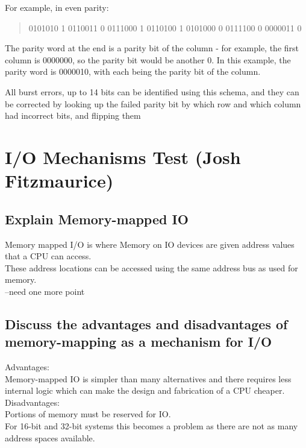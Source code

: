 \documentclass{article}
\begin{document}
For example, in even parity:

\begin{quote}
0101010 1
0110011 0
0111000 1
0110100 1
0101000 0
0111100 0
0000011 0
\end{quote}

The parity word at the end is a parity bit of the column - for example,
the first column is 0000000, so the parity bit would be another 0. In
this example, the parity word is 0000010, with each being the parity bit
of the column.

All burst errors, up to 14 bits can be identified using this schema, and
they can be corrected by looking up the failed parity bit by which row
and which column had incorrect bits, and flipping them











\newpage
\section{I/O Mechanisms Test (Josh Fitzmaurice)}
\subsection{Explain Memory-mapped IO}
Memory mapped I/O is where Memory on IO devices are given address values that a CPU can access.\\
These address locations can be accessed using the same address bus as used for memory.\\
--need one more point

\subsection{Discuss the advantages and disadvantages of memory-mapping as a mechanism for I/O}
Advantages:\\
Memory-mapped IO is simpler than many alternatives and there requires less internal logic which can make the design and fabrication of a CPU cheaper.\\
Disadvantages:\\
Portions of memory must be reserved for IO.\\
For 16-bit and 32-bit systems this becomes a problem as there are not as many address spaces available.
\end{document}

